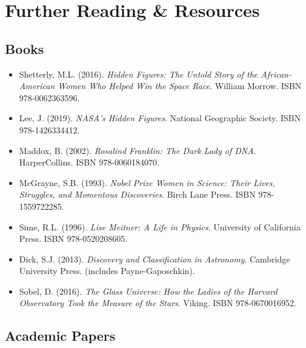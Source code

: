\documentclass[12pt,a4paper]{article}
\begin{document}
\newpage

\section*{Further Reading \& Resources}

\subsection*{Books}

\begin{itemize}[itemsep=6pt]
\item Shetterly, M.L. (2016). \textit{Hidden Figures: The Untold Story of the African-American Women Who Helped Win the Space Race}. William Morrow. ISBN 978-0062363596.
\item Lee, J. (2019). \textit{NASA's Hidden Figures}. National Geographic Society. ISBN 978-1426334412.
\item Maddox, B. (2002). \textit{Rosalind Franklin: The Dark Lady of DNA}. HarperCollins. ISBN 978-0060184070.
\item McGrayne, S.B. (1993). \textit{Nobel Prize Women in Science: Their Lives, Struggles, and Momentous Discoveries}. Birch Lane Press. ISBN 978-1559722285.
\item Sime, R.L. (1996). \textit{Lise Meitner: A Life in Physics}. University of California Press. ISBN 978-0520208605.
\item Dick, S.J. (2013). \textit{Discovery and Classification in Astronomy}. Cambridge University Press. (includes Payne-Gaposchkin).
\item Sobel, D. (2016). \textit{The Glass Universe: How the Ladies of the Harvard Observatory Took the Measure of the Stars}. Viking. ISBN 978-0670016952.
\end{itemize}

\subsection*{Academic Papers}
\end{document}
